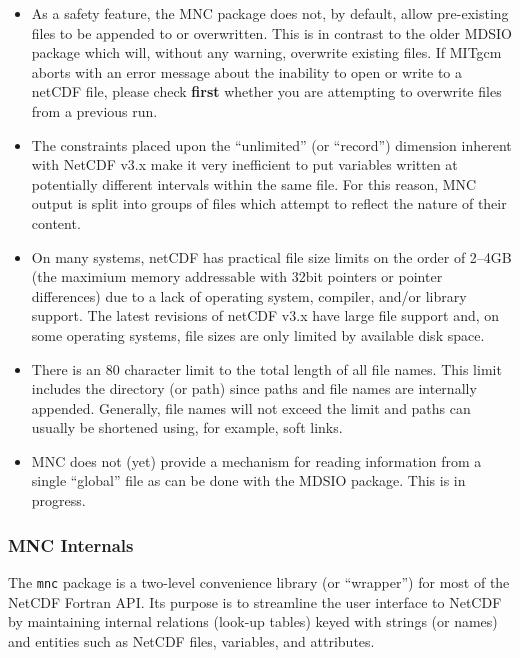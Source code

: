 \begin{itemize}
\item As a safety feature, the MNC package does not, by default, allow
  pre-existing files to be appended to or overwritten.  This is in
  contrast to the older MDSIO package which will, without any warning,
  overwrite existing files.  If MITgcm aborts with an error message
  about the inability to open or write to a netCDF file, please check
  \textbf{first} whether you are attempting to overwrite files from a
  previous run.

\item The constraints placed upon the ``unlimited'' (or ``record'')
  dimension inherent with NetCDF v3.x make it very inefficient to put
  variables written at potentially different intervals within the same
  file.  For this reason, MNC output is split into groups of files
  which attempt to reflect the nature of their content.
  
\item On many systems, netCDF has practical file size limits on the
  order of 2--4GB (the maximium memory addressable with 32bit pointers
  or pointer differences) due to a lack of operating system, compiler,
  and/or library support.  The latest revisions of netCDF v3.x have
  large file support and, on some operating systems, file sizes are
  only limited by available disk space.
  
\item There is an 80 character limit to the total length of all file
  names.  This limit includes the directory (or path) since paths and
  file names are internally appended.  Generally, file names will not
  exceed the limit and paths can usually be shortened using, for
  example, soft links.
  
\item MNC does not (yet) provide a mechanism for reading information
  from a single ``global'' file as can be done with the MDSIO
  package.  This is in progress.
\end{itemize}


\subsubsection{MNC Internals}

The \texttt{mnc} package is a two-level convenience library (or
``wrapper'') for most of the NetCDF Fortran API.  Its purpose is to
streamline the user interface to NetCDF by maintaining internal
relations (look-up tables) keyed with strings (or names) and entities
such as NetCDF files, variables, and attributes.

